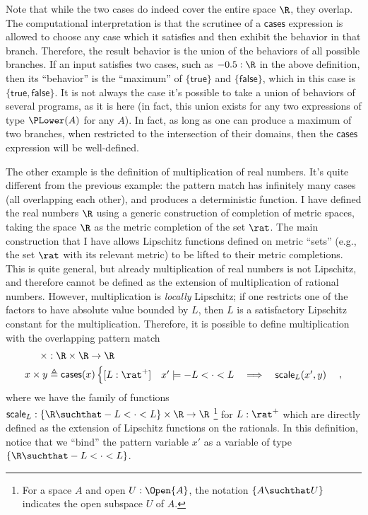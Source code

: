 Note that while the two cases do indeed cover the entire space $\R$, they overlap. The computational interpretation is that the scrutinee of a $\mathsf{cases}$ expression is allowed to choose any case which it satisfies and then exhibit the behavior in that branch. Therefore, the result behavior is the union of the behaviors of all possible branches. If an input satisfies two cases, such as $-0.5 : \R$ in the above definition, then its ``behavior'' is the ``maximum'' of $\{ \mathsf{true} \}$ and $\{ \mathsf{false} \}$, which in this case is $\{ \mathsf{true}, \mathsf{false} \}$. It is not always the case it's possible to take a union of behaviors of several programs, as it is here (in fact, this union exists for any two expressions of type $\PLower(A)$ for any $A$). In fact, as long as one can produce a maximum of two branches, when restricted to the intersection of their domains, then the $\mathsf{cases}$ expression will be well-defined.

The other example is the definition of multiplication of real numbers. It's quite different from the previous example: the pattern match has infinitely many cases (all overlapping each other), and produces a deterministic function. I have defined the real numbers $\R$ using a generic construction of completion of metric spaces, taking the space $\R$ as the metric completion of the set $\rat$. The main construction that I have allows Lipschitz functions defined on metric ``sets'' (e.g., the set $\rat$ with its relevant metric) to be lifted to their metric completions. This is quite general, but already multiplication of real numbers is not Lipschitz, and therefore cannot be defined as the extension of multiplication of rational numbers. However, multiplication is \emph{locally} Lipschitz; if one restricts one of the factors to have absolute value bounded by $L$, then $L$ is a satisfactory Lipschitz constant for the multiplication. Therefore, it is possible to define multiplication with the overlapping pattern match
\begin{align*}
\times &: \R \times \R \to \R
\\ x \times y &\triangleq
\mathsf{cases}(x)
\begin{cases}
[L : \rat^+] \quad x' \models -L < \cdot < L \quad \Longrightarrow \quad \mathsf{scale}_L(x', y)
\end{cases},
\end{align*}
where we have the family of functions $\mathsf{scale}_L : \{ \R \suchthat -L < \cdot < L \} \times \R \to \R$ \footnote{For a space $A$ and open $U : \Open{A}$, the notation $\{ A \suchthat U \}$ indicates the open subspace $U$ of $A$.}
for $L : \rat^+$ which are directly defined as the extension of Lipschitz functions on the rationals. In this definition, notice that we ``bind'' the pattern variable $x'$ as a variable of type $\{ \R \suchthat -L < \cdot < L \}$.


